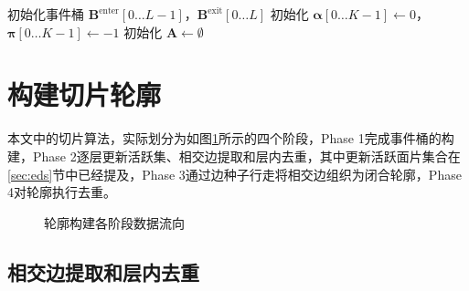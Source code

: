 \begin{algorithm}[htbp]
\caption{基于事件驱动扫掠的相交集合构建算法}
\label{alg:sweep}

初始化事件桶 $\bm{B}^{\mathrm{enter}}[0\ldots L-1]$，$\bm{B}^{\mathrm{exit}}[0\ldots L]$\;
初始化 $\bm{\alpha}[0\ldots K-1]\leftarrow 0$，$\bm{\pi}[0\ldots K-1]\leftarrow -1$\;
初始化 $\bm{A}\leftarrow\emptyset$\;
\;
\end{algorithm}

\section{构建切片轮廓}\label{sec:contour}

本文中的切片算法，实际划分为如图\ref{fig:pipeline}所示的四个阶段，Phase 1完成事件桶的构建，Phase 2逐层更新活跃集、相交边提取和层内去重，其中更新活跃面片集合在\ref{sec:eds}节中已经提及，Phase 3通过边种子行走将相交边组织为闭合轮廓，Phase 4对轮廓执行去重。

\begin{figure}[htbp]
\centering
\caption{轮廓构建各阶段数据流向}
\label{fig:pipeline}
\end{figure}

\subsection{相交边提取和层内去重}

